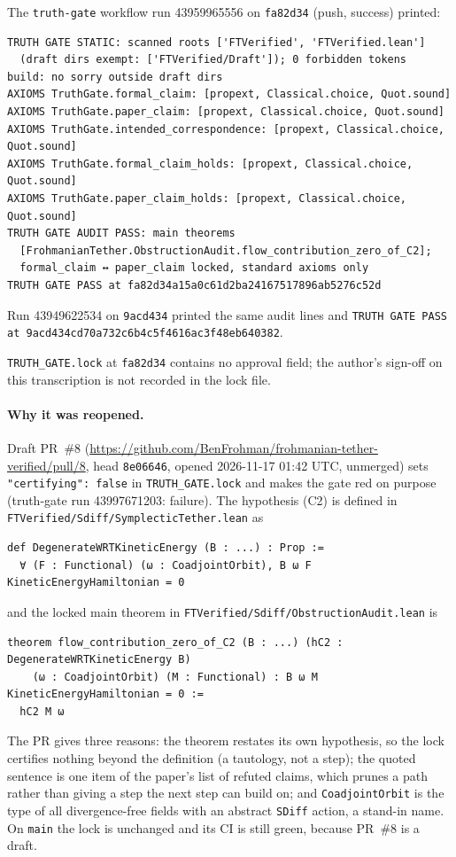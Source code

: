 \documentclass[11pt,a4paper]{article}
\newcommand{\code}[1]{\texttt{#1}}
\begin{document}
The \code{truth-gate} workflow run 43959965556 on \code{fa82d34} (push, success) printed:
\begin{Verbatim}
TRUTH GATE STATIC: scanned roots ['FTVerified', 'FTVerified.lean']
  (draft dirs exempt: ['FTVerified/Draft']); 0 forbidden tokens
build: no sorry outside draft dirs
AXIOMS TruthGate.formal_claim: [propext, Classical.choice, Quot.sound]
AXIOMS TruthGate.paper_claim: [propext, Classical.choice, Quot.sound]
AXIOMS TruthGate.intended_correspondence: [propext, Classical.choice, Quot.sound]
AXIOMS TruthGate.formal_claim_holds: [propext, Classical.choice, Quot.sound]
AXIOMS TruthGate.paper_claim_holds: [propext, Classical.choice, Quot.sound]
TRUTH GATE AUDIT PASS: main theorems
  [FrohmanianTether.ObstructionAudit.flow_contribution_zero_of_C2];
  formal_claim ↔ paper_claim locked, standard axioms only
TRUTH GATE PASS at fa82d34a15a0c61d2ba24167517896ab5276c52d
\end{Verbatim}
Run 43949622534 on \code{9acd434} printed the same audit lines and
\code{TRUTH GATE PASS at 9acd434cd70a732c6b4c5f4616ac3f48eb640382}.

\code{TRUTH\_GATE.lock} at \code{fa82d34} contains no approval field; the author's sign-off on
this transcription is not recorded in the lock file.

\paragraph{Why it was reopened.} Draft PR~\#8
(\url{https://github.com/BenFrohman/frohmanian-tether-verified/pull/8}, head \code{8e06646},
opened 2026-11-17 01:42 UTC, unmerged) sets \code{"certifying": false} in \code{TRUTH\_GATE.lock}
and makes the gate red on purpose (truth-gate run 43997671203: failure). The hypothesis (C2) is
defined in \code{FTVerified/Sdiff/SymplecticTether.lean} as
\begin{Verbatim}
def DegenerateWRTKineticEnergy (B : ...) : Prop :=
  ∀ (F : Functional) (ω : CoadjointOrbit), B ω F KineticEnergyHamiltonian = 0
\end{Verbatim}
and the locked main theorem in \code{FTVerified/Sdiff/ObstructionAudit.lean} is
\begin{Verbatim}
theorem flow_contribution_zero_of_C2 (B : ...) (hC2 : DegenerateWRTKineticEnergy B)
    (ω : CoadjointOrbit) (M : Functional) : B ω M KineticEnergyHamiltonian = 0 :=
  hC2 M ω
\end{Verbatim}
The PR gives three reasons: the theorem restates its own hypothesis, so the lock certifies nothing
beyond the definition (a tautology, not a step); the quoted sentence is one item of the paper's
list of refuted claims, which prunes a path rather than giving a step the next step can build on;
and \code{CoadjointOrbit} is the type of all divergence-free fields with an abstract
\code{SDiff} action, a stand-in name. On \code{main} the lock is unchanged and its CI is still
green, because PR~\#8 is a draft.
\end{document}
